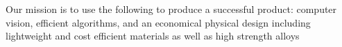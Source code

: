 Our mission is to use the following to produce a successful product: computer vision, efficient algorithms, and an economical physical design including lightweight and cost efficient materials as well as high strength alloys
